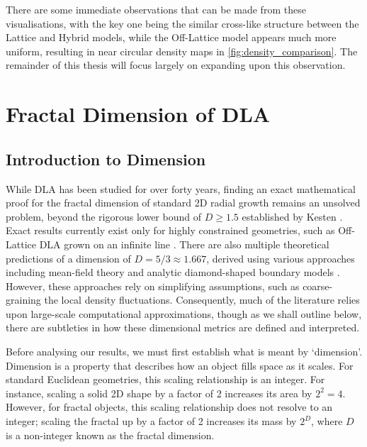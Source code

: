 \documentclass[12pt, a4paper, oneside]{report}
\theoremstyle{remark}
\begin{document}
There are some immediate observations that can be made from these visualisations, with the key one being the similar cross-like structure between the Lattice and Hybrid models, while the Off-Lattice model appears much more uniform, resulting in near circular density maps in \cref{fig:density_comparison}. The remainder of this thesis will focus largely on expanding upon this observation.


\chapter{Fractal Dimension of DLA}
\label{ch:dim}

\section{Introduction to Dimension}
\label{sec:dim_overview}
While DLA has been studied for over forty years, finding an exact mathematical proof for the fractal dimension of standard 2D radial growth remains an unsolved problem, beyond the rigorous lower bound of $D \ge 1.5$ established by Kesten \cite{Kesten1987}. Exact results currently exist only for highly constrained geometries, such as Off-Lattice DLA grown on an infinite line \cite{Procaccia2021}. There are also multiple theoretical predictions of a dimension of $D=5/3 \approx 1.667$, derived using various approaches including mean-field theory \cite{tokuyama1984} and analytic diamond-shaped boundary models \cite{Ball1985}. However, these approaches rely on simplifying assumptions, such as coarse-graining the local density fluctuations. Consequently, much of the literature relies upon large-scale computational approximations, though as we shall outline below, there are subtleties in how these dimensional metrics are defined and interpreted.

Before analysing our results, we must first establish what is meant by `dimension'. 
Dimension is a property that describes how an object fills space as it scales. For standard Euclidean geometries, this scaling relationship is an integer. For instance, scaling a solid 2D shape by a factor of 2 increases its area by $2^2 = 4$. However, for fractal objects, this scaling relationship does not resolve to an integer; scaling the fractal up by a factor of 2 increases its mass by $2^D$, where $D$ is a non-integer known as the fractal dimension. 
\end{document}
